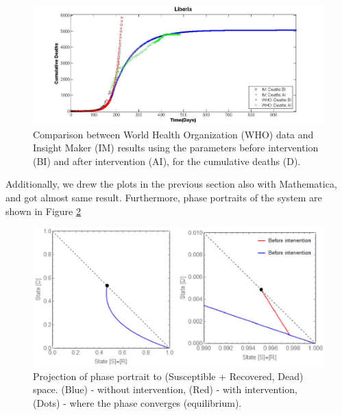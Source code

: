 \begin{figure}[!h]
  \centering
  \includegraphics[width=1\textwidth]{LB_Int2_SD_WHO_IM}
  \caption{ Comparison between World Health Organization (WHO) data and Insight Maker (IM) results using the parameters before intervention (BI) and after intervention (AI), for the cumulative deaths (D).}
\label{fig:LB_IM_WHO2} 
\end{figure}


Additionally, we drew the plots in the previous section also with Mathematica, and got almost same result. Furthermore, phase portraits of the system are shown in Figure \ref{fig:PhasePortrait}

\begin{figure}[!h]
  \centering
  \includegraphics[width=1\textwidth]{PhasePortrait}
  \caption{Projection of phase portrait to (Susceptible + Recovered, Dead) space. (Blue) - without intervention, (Red) - with intervention, (Dots) - where the phase converges (equilibrium).}
\label{fig:PhasePortrait}
\end{figure}
